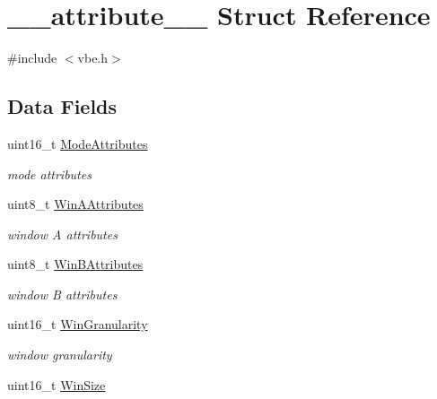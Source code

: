 \hypertarget{struct____attribute____}{}\section{\+\_\+\+\_\+attribute\+\_\+\+\_\+ Struct Reference}
\label{struct____attribute____}


{\ttfamily \#include $<$vbe.\+h$>$}

\subsection*{Data Fields}
\begin{DoxyCompactItemize}
\item 
\hypertarget{group__vbe_gad7593abf9d201ce5e59de60baba548cd}{}uint16\+\_\+t \hyperlink{group__vbe_gad7593abf9d201ce5e59de60baba548cd}{Mode\+Attributes}\label{group__vbe_gad7593abf9d201ce5e59de60baba548cd}

\begin{DoxyCompactList}\small\item\em mode attributes \end{DoxyCompactList}\item 
\hypertarget{group__vbe_gaaa90049ea7f03763acbbf75240f4f5d8}{}uint8\+\_\+t \hyperlink{group__vbe_gaaa90049ea7f03763acbbf75240f4f5d8}{Win\+A\+Attributes}\label{group__vbe_gaaa90049ea7f03763acbbf75240f4f5d8}

\begin{DoxyCompactList}\small\item\em window A attributes \end{DoxyCompactList}\item 
\hypertarget{group__vbe_ga370ddeb84e904ef1000fe57905ebf6b8}{}uint8\+\_\+t \hyperlink{group__vbe_ga370ddeb84e904ef1000fe57905ebf6b8}{Win\+B\+Attributes}\label{group__vbe_ga370ddeb84e904ef1000fe57905ebf6b8}

\begin{DoxyCompactList}\small\item\em window B attributes \end{DoxyCompactList}\item 
\hypertarget{group__vbe_ga38f205f799c6929629395f03e24de077}{}uint16\+\_\+t \hyperlink{group__vbe_ga38f205f799c6929629395f03e24de077}{Win\+Granularity}\label{group__vbe_ga38f205f799c6929629395f03e24de077}

\begin{DoxyCompactList}\small\item\em window granularity \end{DoxyCompactList}\item 
\hypertarget{group__vbe_ga78985f1c5ae166cb560099273cc558b4}{}uint16\+\_\+t \hyperlink{group__vbe_ga78985f1c5ae166cb560099273cc558b4}{Win\+Size}\label{group__vbe_ga78985f1c5ae166cb560099273cc558b4}


\end{DoxyCompactItemize}
